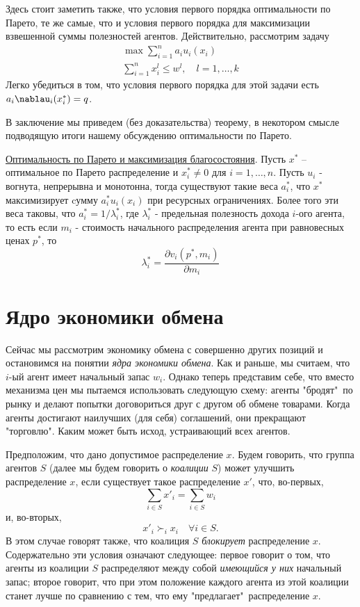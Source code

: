 Здесь стоит заметить также, что условия первого порядка оптимальности по
Парето, те же самые, что и условия первого порядка для максимизации
взвешенной суммы полезностей агентов. Действительно, рассмотрим задачу
$$
\begin{array}{c}
\max\sum^n_{i=1}a_iu_i(x_i)\\
\sum^n_{i=1}x^l_i\le w^l,\quad l=1,\ldots,k
\end{array}
$$
Легко убедиться в том, что условия первого порядка для этой задачи
есть $a_i\nablau_i(x^*_i)=q$.

В заключение мы приведем (без доказательства) теорему, в некотором смысле
подводящую итоги нашему обсуждению оптимальности по Парето.

\underline{Оптимальность по Парето и максимизация благосостояния}.
Пусть $x^*$ -- оптимальное по Парето  распределение и $x^*_i \ne 0$
для $i=1,\ldots,n$. Пусть $u_i$ - вогнута, непрерывна и монотонна,
тогда существуют такие веса $a^*_i$, что $x^*$ максимизирует cумму
$a^*_iu_i(x_i)$ при ресурсных ограничениях. Более того эти веса
таковы, что $a^*_i=1/\lambda^*_i$, где $\lambda^*_i$ - предельная
полезность дохода $i$-ого агента, то есть если $m_i$ - стоимость
начального распределения агента при равновесных ценах $p^*$, то
$$
\lambda^*_i={\frac{\partial v_i(p^*,m_i)}{\partial m_i}}
$$

\section*{Ядро экономики обмена}

Сейчас мы рассмотрим экономику обмена с совершенно других позиций и остановимся
на понятии \emph{ядра экономики обмена}. Как и раньше, мы считаем, что $i$-ый агент имеет
начальный запас $w_i$. Однако теперь представим себе, что вместо
механизма цен мы пытаемся использовать следующую схему: агенты "бродят"\,
по рынку и делают попытки договориться друг с другом об обмене товарами. Когда агенты
достигают наилучших (для себя) соглашений, они прекращают "торговлю".
Каким может быть исход, устраивающий всех агентов.

Предположим, что дано допустимое распределение $x$. Будем говорить, что группа
агентов $S$ (далее мы будем говорить о \emph{коалиции} $S$) может улучшить распределение $x$,
если существует такое распределение $x'$, что, во-первых,
$$\sum_{i\in S}x'_i=\sum_{i\in S}w_i$$
и, во-вторых,
$$
x'_i\succ_i x_i\quad\forall i\in S.
$$
В этом случае говорят также, что коалиция $S$ \emph{блокирует} распределение $x$.
Содержательно эти условия означают следующее: первое говорит о том, что
агенты из коалиции $S$ распределяют между собой
\emph{имеющийся у них} начальный запас; второе говорит, что при этом
положение каждого агента из этой коалиции станет лучше по сравнению с
тем, что ему "предлагает"\, распределение $x$.

